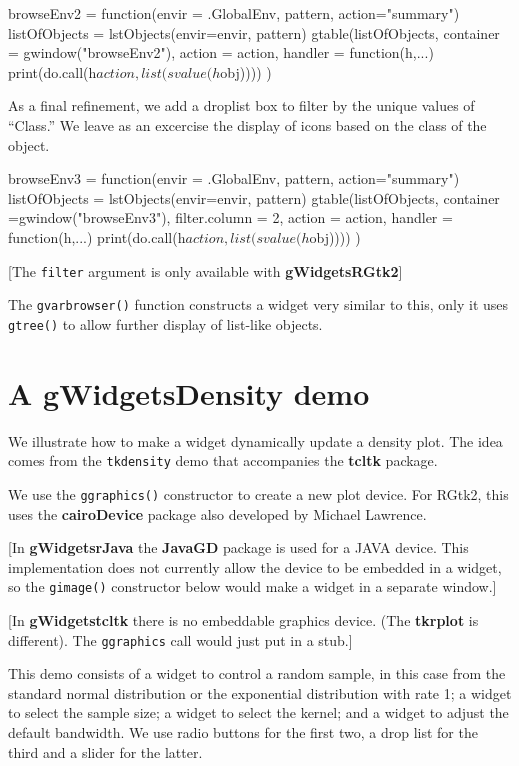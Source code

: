 \documentclass[12pt]{article}
\newcommand{\RCode}[1]{\texttt{#1}}
\newcommand{\RFunc}[1]{\texttt{#1()}}
\newcommand{\RPackage}[1]{\textbf{#1}}
\begin{document}
\begin{Scode}
  browseEnv2 = function(envir = .GlobalEnv, pattern, action="summary") {
    listOfObjects = lstObjects(envir=envir, pattern)
    gtable(listOfObjects, container = gwindow("browseEnv2"),
    action = action, 
    handler = function(h,...) {
      print(do.call(h$action, list(svalue(h$obj))))
    })
  }
\end{Scode}

As a final refinement, we  add a droplist box to filter by the unique
values of ``Class.'' We leave as an excercise the display of icons
based on the class of the object.
\begin{Scode}
  browseEnv3 = function(envir = .GlobalEnv, pattern, action="summary") {
    listOfObjects = lstObjects(envir=envir, pattern)
    gtable(listOfObjects, 
    container =gwindow("browseEnv3"),
    filter.column = 2,
    action = action, 
    handler = function(h,...) {
      print(do.call(h$action, list(svalue(h$obj))))
    })
  }
\end{Scode}
[The \RCode{filter} argument is only available with \RPackage{gWidgetsRGtk2}]

The \RFunc{gvarbrowser} function constructs a widget very similar to
this, only it uses \RFunc{gtree} to allow further display of
list-like objects.


\section{A gWidgetsDensity demo}
\label{sec:repeating-plot}

We illustrate how to make a widget dynamically update a density
plot. The idea comes from the \RCode{tkdensity} demo that accompanies
the \RPackage{tcltk} package.

We use the  \RFunc{ggraphics} constructor to create a new plot device. For
RGtk2, this uses the \RPackage{cairoDevice} package also developed
by Michael Lawrence.

[In \RPackage{gWidgetsrJava} the \RPackage{JavaGD} package is used for
a JAVA device. This implementation does not currently allow the device
to be embedded in a widget, so the \RFunc{gimage} constructor below
would make a widget in a separate window.]

[In \RPackage{gWidgetstcltk} there is no embeddable graphics
device. (The \RPackage{tkrplot} is different). The \RCode{ggraphics}
call would just put in a stub.]

This demo consists of a widget to control a random sample, in this case
from the standard normal distribution or the exponential distribution
with rate 1; a widget to select the sample size; a widget to select the
kernel; and a widget to adjust the default bandwidth. We use radio
buttons for the first two, a drop list for the third and a slider for
the latter.
\end{document}
